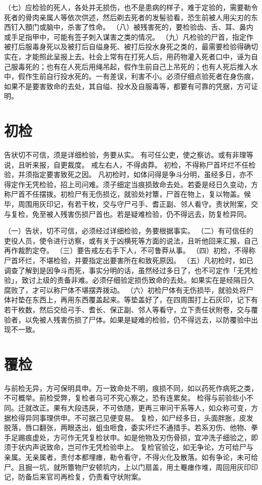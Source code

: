\documentclass[12pt,UTF8]{ctexbook}
\begin{document}
（七）应检验的死人，各处并无损伤，也不是患病的样子，难于定验的，需要勒令死者的骨肉亲属人等依次供述，然后剃去死者的发髻验看，恐生前被人用尖刃的东西钉入顖门或脑中，杀害了性命。
（八）被残害死的，要检验齿、舌、耳、鼻内或手足指甲中，可能有签子刺入谋害之类的情况。
（九）凡检验的尸首，指定作被打后服毒身死以及被打后自缢身死、被打后投水身死之类的，最需要检验得确切实在，才能照此呈报上去。社会上常有在打死人后，用药物灌入死者口中，诬为自己服毒死的；也有在人死后用绳吊起，假作生前自己上吊死的；也有人死后推入水中，假作生前自行投水死的。一有差误，利害不小。必须仔细点验死者在身伤痕，如果不是要害致命的去处，其自缢、投水及自服毒等，都要有可靠的凭据，方可证明。


\chapter{初检}

告状切不可信，须是详细检验，务要从实。
有可任公吏，使之察访。或有非理等说，且听来报，自更裁度。
戒左右人，不得卤莽。
初检，不得称尸首坏烂不任检验，并须指定要害致死之因。
凡初检时，如体问得是争斗分明，虽经多日，亦不得定作无凭检验，招上司问难。须子细定当痕损致命去处。若委是经日久变动，方称尸首不任摆拨。初检尸有无伤损讫，就验处衬簟，尸首在物上，复以物盖。候毕，周围用灰印记，有若干枚，交与守尸弓手、耆正副、邻人看守。责状附案，交与复检，免至被人残害伤损尸首也。若是疑难检验，仍不得远去，防复检异同。


（一）告状，切不可信，必须经过详细检验，务要根据事实。
（二）有可信任的吏役人员，使令进行访察，或有关于凶横死等方面的说法，且听他回来汇报，自己再作裁酌定夺。
（三）要告戒左右手下人，不可鲁莽从事。
（四）初检，不得称尸首坏烂，不堪检验，并要指定出要害所在和致死原因。
（五）凡初检时，如已调查了解到是因争斗而死，事实分明的话，虽然经过多日了，也不可定作「无凭检验」，致讨上级的责备非难。必须仔细验定损伤致命的去处。如果实在是经隔日久腐败了，才可以称尸体不堪摆弄拨动。
（六）初检尸体有无伤损毕，就验处将尸体衬垫在东西上，再用东西覆盖起来。等垫盖好了，在四周围打上石灰印，记下有若干枚数，然后交给弓手、耆长、保正副、邻人等看守，立下责任状附卷，交与覆验者，以免被人残害伤损了尸体。如果是疑难的检验，仍不得远去，以防覆验中出现不一致。


\chapter{覆检}

与前检无异，方可保明具申。万一致命处不明，痕损不同，如以药死作病死之类，不可概举。前检受弊，复检者乌可不究心察之，恐有连累矣。
检得与前验些小不同。迁就改正。果有大段违戾，不可依随，更再三审问干系等人，如众称可变，方据检得异同事理供申。不可据己见便变易。
复检，如尸经多日，头面胖胀，皮发脱落，唇口翻张，两眼迭出，蛆虫咂食，委实坏烂不通措手。若系刃伤、他物、拳手足踢痕虚处，方可作无凭复检状申。如是他物及刃伤骨损，宜冲洗子细验之，即须于状内声说致命，岂可作无凭检验申上。
复检官验讫，如无争论，方可给尸与亲属。无亲属者，责付本都埋瘗，勒令看守，不得火化及散落。如有争论，未可给尸。且掘一坑，就所簟物尸安顿坑内，上以门扇盖，用土罨瘗作堆，周回用灰印印记，防备后来官司再检复，仍责看守状附案。
\end{document}
